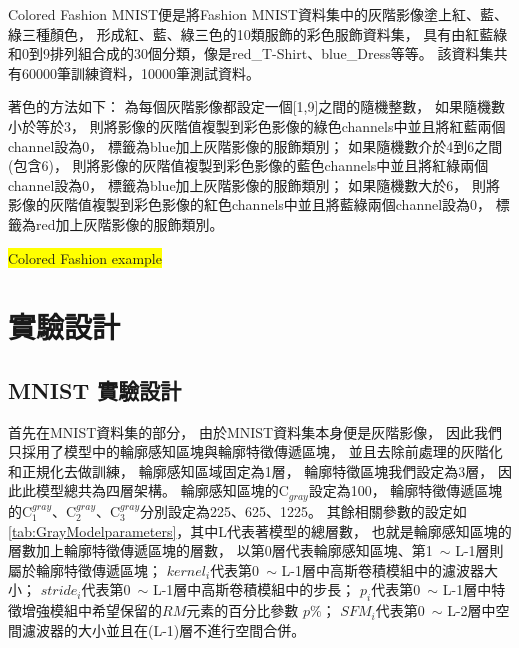 \documentclass[class=NCU\_thesis, crop=false]{standalone}
\begin{document}
    Colored Fashion MNIST便是將Fashion MNIST資料集中的灰階影像塗上紅、藍、綠三種顏色，
    形成紅、藍、綠三色的10類服飾的彩色服飾資料集，
    具有由紅藍綠和0到9排列組合成的30個分類，像是red\_T-Shirt、blue\_Dress等等。
    該資料集共有60000筆訓練資料，10000筆測試資料。

    著色的方法如下：
    為每個灰階影像都設定一個[1,9]之間的隨機整數，
    如果隨機數小於等於3，
    則將影像的灰階值複製到彩色影像的綠色channels中並且將紅藍兩個channel設為0，
    標籤為blue加上灰階影像的服飾類別；
    如果隨機數介於4到6之間(包含6)，
    則將影像的灰階值複製到彩色影像的藍色channels中並且將紅綠兩個channel設為0，
    標籤為blue加上灰階影像的服飾類別；
    如果隨機數大於6，
    則將影像的灰階值複製到彩色影像的紅色channels中並且將藍綠兩個channel設為0，
    標籤為red加上灰階影像的服飾類別。

    \colorbox {yellow}{Colored Fashion example}

\section{實驗設計}
    \subsection{MNIST 實驗設計}
    首先在MNIST資料集的部分，
    由於MNIST資料集本身便是灰階影像，
    因此我們只採用了模型中的輪廓感知區塊與輪廓特徵傳遞區塊，
    並且去除前處理的灰階化和正規化去做訓練，
    輪廓感知區域固定為1層，
    輪廓特徵區塊我們設定為3層，
    因此此模型總共為四層架構。
    輪廓感知區塊的C$_{gray}$設定為100，
    輪廓特徵傳遞區塊的C$^{gray}_{1}$、C$^{gray}_{2}$、C$^{gray}_{3}$分別設定為225、625、1225。
    其餘相關參數的設定如\cref{tab:GrayModelparameters}，其中L代表著模型的總層數，
    也就是輪廓感知區塊的層數加上輪廓特徵傳遞區塊的層數，
    以第0層代表輪廓感知區塊、第1~$\sim$ L-1層則屬於輪廓特徵傳遞區塊；
    $kernel_{i}$代表第0~$\sim$ L-1層中高斯卷積模組中的濾波器大小；
    $stride_{i}$代表第0~$\sim$ L-1層中高斯卷積模組中的步長；
    $p_{i}$代表第0~$\sim$ L-1層中特徵增強模組中希望保留的$RM$元素的百分比參數 $p\%$；
    $SFM_{i}$代表第0~$\sim$ L-2層中空間濾波器的大小並且在(L-1)層不進行空間合併。
\end{document}
